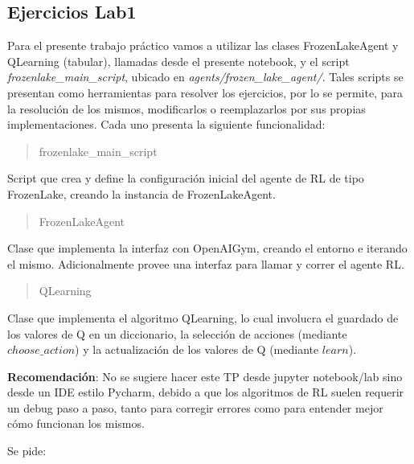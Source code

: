 \documentclass[11pt]{article}
\begin{document}
    \subsection{Ejercicios Lab1}\label{ejercicios-lab1}

Para el presente trabajo práctico vamos a utilizar las clases
FrozenLakeAgent y QLearning (tabular), llamadas desde el presente
notebook, y el script \emph{frozenlake\_main\_script}, ubicado en
\emph{agents/frozen\_lake\_agent/}. Tales scripts se presentan como
herramientas para resolver los ejercicios, por lo se permite, para la
resolución de los mismos, modificarlos o reemplazarlos por sus propias
implementaciones. Cada uno presenta la siguiente funcionalidad:

\begin{quote}
frozenlake\_main\_script
\end{quote}

Script que crea y define la configuración inicial del agente de RL de
tipo FrozenLake, creando la instancia de FrozenLakeAgent.

\begin{quote}
FrozenLakeAgent
\end{quote}

Clase que implementa la interfaz con OpenAIGym, creando el entorno e
iterando el mismo. Adicionalmente provee una interfaz para llamar y
correr el agente RL.

\begin{quote}
QLearning
\end{quote}

Clase que implementa el algoritmo QLearning, lo cual involucra el
guardado de los valores de Q en un diccionario, la selección de acciones
(mediante \(choose\_action\)) y la actualización de los valores de Q
(mediante \(learn\)).

\textbf{Recomendación}: No se sugiere hacer este TP desde jupyter
notebook/lab sino desde un IDE estilo Pycharm, debido a que los
algoritmos de RL suelen requerir un debug paso a paso, tanto para
corregir errores como para entender mejor cómo funcionan los mismos.

Se pide:
\end{document}
